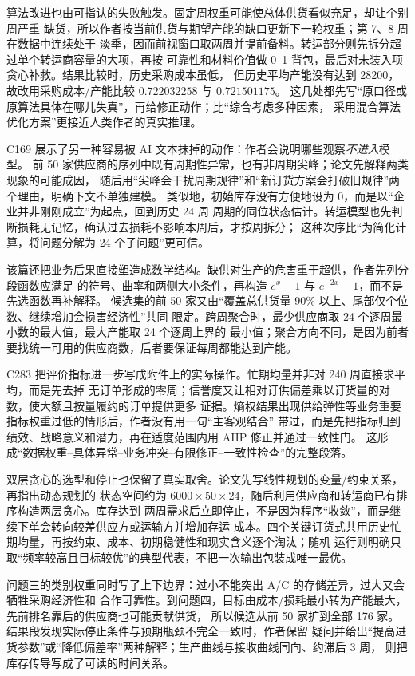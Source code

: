 算法改进也由可指认的失败触发。固定周权重可能使总体供货看似充足，却让个别周严重
缺货，所以作者按当前供货与期望产能的缺口更新下一轮权重；第 7、8 周在数据中连续处于
淡季，因而前视窗口取两周并提前备料。转运部分则先拆分超过单个转运商容量的大项，再按
可靠性和材料价值做 0--1 背包，最后对未装入项贪心补救。结果比较时，历史采购成本虽低，
但历史平均产能没有达到 28200，故改用采购成本/产能比较 $0.722032258$ 与 $0.721501175$。
这几处都先写“原口径或原算法具体在哪儿失真”，再给修正动作；比“综合考虑多种因素，
采用混合算法优化方案”更接近人类作者的真实推理。

C169 展示了另一种容易被 AI 文本抹掉的动作：作者会说明哪些观察\emph{不进入}模型。
前 50 家供应商的序列中既有周期性异常，也有非周期尖峰；论文先解释两类现象的可能成因，
随后用“尖峰会干扰周期规律”和“新订货方案会打破旧规律”两个理由，明确下文不单独建模。
类似地，初始库存没有方便地设为 0，而是以“企业并非刚刚成立”为起点，回到历史 24 周
周期的同位状态估计。转运模型也先判断损耗无记忆，确认过去损耗不影响本周后，才按周拆分；
这种次序比“为简化计算，将问题分解为 24 个子问题”更可信。

该篇还把业务后果直接塑造成数学结构。缺供对生产的危害重于超供，作者先列分段函数应满足
的符号、曲率和两侧大小条件，再构造 $e^x-1$ 与 $e^{-2x}-1$，而不是先选函数再补解释。
候选集的前 50 家又由“覆盖总供货量 90\% 以上、尾部仅个位数、继续增加会损害经济性”共同
限定。跨周聚合时，最少供应商取 24 个逐周最小数的最大值，最大产能取 24 个逐周上界的
最小值；聚合方向不同，是因为前者要找统一可用的供应商数，后者要保证每周都能达到产能。

C283 把评价指标进一步写成附件上的实际操作。忙期均量并非对 240 周直接求平均，而是先去掉
无订单形成的零周；信誉度又让相对订供偏差乘以订货量的对数，使大额且按量履约的订单提供更多
证据。熵权结果出现供给弹性等业务重要指标权重过低的情形后，作者没有用一句“主客观结合”
带过，而是先把指标归到绩效、战略意义和潜力，再在适度范围内用 AHP 修正并通过一致性门。
这形成“数据权重--具体异常--业务冲突--有限修正--一致性检查”的完整段落。

双层贪心的选型和停止也保留了真实取舍。论文先写线性规划的变量/约束关系，再指出动态规划的
状态空间约为 $6000\times50\times24$，随后利用供应商和转运商已有排序构造两层贪心。库存达到
两周需求后立即停止，不是因为程序“收敛”，而是继续下单会转向较差供应方或运输方并增加存运
成本。四个关键订货式共用历史忙期均量，再按约束、成本、初期稳健性和现实含义逐个淘汰；随机
运行则明确只取“频率较高且目标较优”的典型代表，不把一次输出包装成唯一最优。

问题三的类别权重同时写了上下边界：过小不能突出 A/C 的存储差异，过大又会牺牲采购经济性和
合作可靠性。到问题四，目标由成本/损耗最小转为产能最大，先前排名靠后的供应商也可能贡献供货，
所以候选从前 50 家扩到全部 176 家。结果段发现实际停止条件与预期瓶颈不完全一致时，作者保留
疑问并给出“提高进货参数”或“降低偏差率”两种解释；生产曲线与接收曲线同向、约滞后 3 周，
则把库存传导写成了可读的时间关系。

